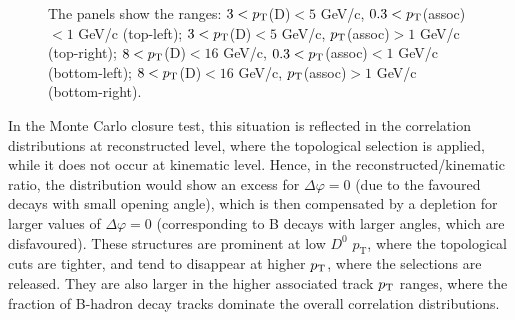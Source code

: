 \begin{figure}
{The panels show the ranges: $3 < p_{\rm T}$(D)$ < 5$ GeV/c, $0.3 < p_{\rm T}$(assoc)$ < 1$ GeV/c (top-left); $3 < p_{\rm T}$(D)$ < 5$ GeV/c, $p_{\rm T}$(assoc)$ > 1$ GeV/c (top-right); $8 < p_{\rm T}$(D)$ < 16$ GeV/c, $0.3 < p_{\rm T}$(assoc)$ < 1$ GeV/c (bottom-left); $8 < p_{\rm T}$(D)$ < 16$ GeV/c, $p_{\rm T}$(assoc)$ > 1$ GeV/c (bottom-right).}
\label{fig:MC_Ratios}
\end{figure}

In the Monte Carlo closure test, this situation is reflected in the correlation distributions at reconstructed level, where the topological selection is applied, while it does not occur at kinematic level. Hence, in the reconstructed/kinematic ratio, the distribution would show an excess for $\Delta\varphi = 0$ (due to the favoured decays with small opening angle), which is then compensated by a depletion for larger values of $\Delta\varphi = 0$ (corresponding to B decays with larger angles, which are disfavoured).
These structures are prominent at low $D^0$ $p_\text{T}$, where the topological cuts are tighter, and tend to disappear at higher $p_{\rm T}$, where the selections are released. They are also larger in the higher associated track $p_{\rm T}$ ranges, where the fraction of B-hadron decay tracks dominate the overall correlation distributions.

